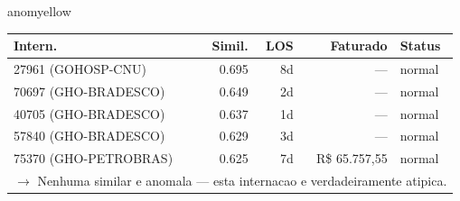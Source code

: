 \documentclass[a4paper,10pt]{article}
\begin{document}
\begin{anomalycard}[Internacao 166841 | GHO-PETROBRAS | MODERADO (z=2.10)]{anomyellow}
\begin{tabular}{l r r r l}\toprule\textbf{Intern.} & \textbf{Simil.} & \textbf{LOS} & \textbf{Faturado} & \textbf{Status} \\\midrule
27961 (GOHOSP-CNU) & 0.695 & 8d & --- & \textcolor{jcubeblue}{normal} \\
70697 (GHO-BRADESCO) & 0.649 & 2d & --- & \textcolor{jcubeblue}{normal} \\
40705 (GHO-BRADESCO) & 0.637 & 1d & --- & \textcolor{jcubeblue}{normal} \\
57840 (GHO-BRADESCO) & 0.629 & 3d & --- & \textcolor{jcubeblue}{normal} \\
75370 (GHO-PETROBRAS) & 0.625 & 7d & R\$ 65.757,55 & \textcolor{jcubeblue}{normal} \\
\multicolumn{5}{l}{\textcolor{jcubeblue}{\small $\rightarrow$ Nenhuma similar e anomala --- esta internacao e verdadeiramente atipica.}} \\
\bottomrule\end{tabular}


\end{anomalycard}

\newpage
\end{document}
